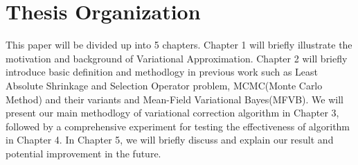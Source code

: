 \section{Thesis Organization}
This paper will be divided up into 5 chapters. Chapter 1 will briefly illustrate the motivation and background of Variational Approximation. Chapter 2 will briefly introduce basic definition and methodlogy in previous work such as Least Absolute Shrinkage and Selection Operator problem, MCMC(Monte Carlo Method) and their variants and Mean-Field Variational Bayes(MFVB). We will present our main methodlogy of variational correction algorithm in Chapter 3, followed by a comprehensive experiment for testing the effectiveness of algorithm in Chapter 4. In Chapter 5, we will briefly discuss and explain our result and potential improvement in the future. 



 
